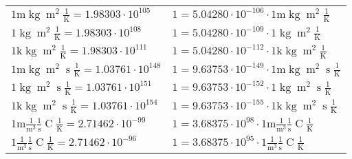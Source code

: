 \begin{center}
\begin{longtable}{l l}
{\color{gray}$1 \bm{\mathrm{ m}}\operatorname{kg}{\operatorname{m}^2}{}{}\frac1{\operatorname{K}} = 1.98303\cdot10^{105} $}   & {\color{gray}$ 1 = 5.04280\cdot10^{-106} \cdot 1 \bm{\mathrm{ m}}\operatorname{kg}{\operatorname{m}^2}{}{}\frac1{\operatorname{K}}$}  \\
{\color{black}$1 \bm{\mathrm{ }}\operatorname{kg}{\operatorname{m}^2}{}{}\frac1{\operatorname{K}} = 1.98303\cdot10^{108} $}   & {\color{black}$ 1 = 5.04280\cdot10^{-109} \cdot 1 \bm{\mathrm{ }}\operatorname{kg}{\operatorname{m}^2}{}{}\frac1{\operatorname{K}}$}  \\
{\color{gray}$1 \bm{\mathrm{ k}}\operatorname{kg}{\operatorname{m}^2}{}{}\frac1{\operatorname{K}} = 1.98303\cdot10^{111} $}   & {\color{gray}$ 1 = 5.04280\cdot10^{-112} \cdot 1 \bm{\mathrm{ k}}\operatorname{kg}{\operatorname{m}^2}{}{}\frac1{\operatorname{K}}$}  \\
{\color{gray}$1 \bm{\mathrm{ m}}\operatorname{kg}{\operatorname{m}^2}{\operatorname{s}}{}\frac1{\operatorname{K}} = 1.03761\cdot10^{148} $}   & {\color{gray}$ 1 = 9.63753\cdot10^{-149} \cdot 1 \bm{\mathrm{ m}}\operatorname{kg}{\operatorname{m}^2}{\operatorname{s}}{}\frac1{\operatorname{K}}$}  \\
{\color{black}$1 \bm{\mathrm{ }}\operatorname{kg}{\operatorname{m}^2}{\operatorname{s}}{}\frac1{\operatorname{K}} = 1.03761\cdot10^{151} $}   & {\color{black}$ 1 = 9.63753\cdot10^{-152} \cdot 1 \bm{\mathrm{ }}\operatorname{kg}{\operatorname{m}^2}{\operatorname{s}}{}\frac1{\operatorname{K}}$}  \\
{\color{gray}$1 \bm{\mathrm{ k}}\operatorname{kg}{\operatorname{m}^2}{\operatorname{s}}{}\frac1{\operatorname{K}} = 1.03761\cdot10^{154} $}   & {\color{gray}$ 1 = 9.63753\cdot10^{-155} \cdot 1 \bm{\mathrm{ k}}\operatorname{kg}{\operatorname{m}^2}{\operatorname{s}}{}\frac1{\operatorname{K}}$}  \\
\hline{\color{gray}$1 \bm{\mathrm{ m}}\frac1{\operatorname{m}^3}\frac1{\operatorname{s}}{\operatorname{C}}\frac1{\operatorname{K}} = 2.71462\cdot10^{-99} $}   & {\color{gray}$ 1 = 3.68375\cdot10^{98} \cdot 1 \bm{\mathrm{ m}}\frac1{\operatorname{m}^3}\frac1{\operatorname{s}}{\operatorname{C}}\frac1{\operatorname{K}}$}  \\
{\color{black}$1 \bm{\mathrm{ }}\frac1{\operatorname{m}^3}\frac1{\operatorname{s}}{\operatorname{C}}\frac1{\operatorname{K}} = 2.71462\cdot10^{-96} $}   & {\color{black}$ 1 = 3.68375\cdot10^{95} \cdot 1 \bm{\mathrm{ }}\frac1{\operatorname{m}^3}\frac1{\operatorname{s}}{\operatorname{C}}\frac1{\operatorname{K}}$}  \\

\end{longtable}
\end{center}
